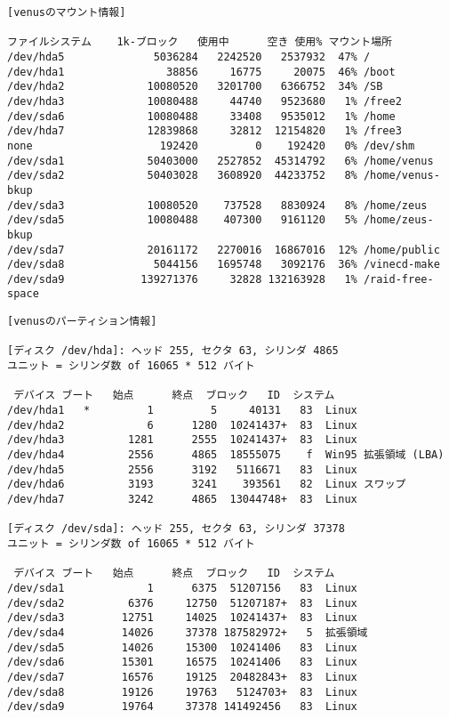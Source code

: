 \documentclass{jarticle}
\begin{document}
\begin{verbatim}
[venusのマウント情報]

ファイルシステム    1k-ブロック   使用中      空き 使用% マウント場所
/dev/hda5              5036284   2242520   2537932  47% /
/dev/hda1                38856     16775     20075  46% /boot
/dev/hda2             10080520   3201700   6366752  34% /SB
/dev/hda3             10080488     44740   9523680   1% /free2
/dev/sda6             10080488     33408   9535012   1% /home
/dev/hda7             12839868     32812  12154820   1% /free3
none                    192420         0    192420   0% /dev/shm
/dev/sda1             50403000   2527852  45314792   6% /home/venus
/dev/sda2             50403028   3608920  44233752   8% /home/venus-bkup
/dev/sda3             10080520    737528   8830924   8% /home/zeus
/dev/sda5             10080488    407300   9161120   5% /home/zeus-bkup
/dev/sda7             20161172   2270016  16867016  12% /home/public
/dev/sda8              5044156   1695748   3092176  36% /vinecd-make
/dev/sda9            139271376     32828 132163928   1% /raid-free-space
\end{verbatim}

\begin{verbatim}
[venusのパーティション情報]

[ディスク /dev/hda]: ヘッド 255, セクタ 63, シリンダ 4865
ユニット = シリンダ数 of 16065 * 512 バイト

 デバイス ブート   始点      終点  ブロック   ID  システム
/dev/hda1   *         1         5     40131   83  Linux
/dev/hda2             6      1280  10241437+  83  Linux
/dev/hda3          1281      2555  10241437+  83  Linux
/dev/hda4          2556      4865  18555075    f  Win95 拡張領域 (LBA)
/dev/hda5          2556      3192   5116671   83  Linux
/dev/hda6          3193      3241    393561   82  Linux スワップ
/dev/hda7          3242      4865  13044748+  83  Linux

[ディスク /dev/sda]: ヘッド 255, セクタ 63, シリンダ 37378
ユニット = シリンダ数 of 16065 * 512 バイト

 デバイス ブート   始点      終点  ブロック   ID  システム
/dev/sda1             1      6375  51207156   83  Linux
/dev/sda2          6376     12750  51207187+  83  Linux
/dev/sda3         12751     14025  10241437+  83  Linux
/dev/sda4         14026     37378 187582972+   5  拡張領域
/dev/sda5         14026     15300  10241406   83  Linux
/dev/sda6         15301     16575  10241406   83  Linux
/dev/sda7         16576     19125  20482843+  83  Linux
/dev/sda8         19126     19763   5124703+  83  Linux
/dev/sda9         19764     37378 141492456   83  Linux
\end{verbatim}
\end{document}
